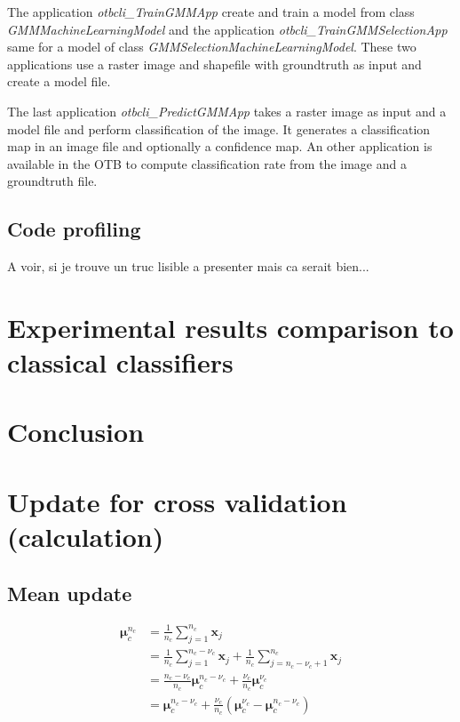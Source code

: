 \documentclass[a4paper,11pt,DIV=16]{scrartcl}
\begin{document}
        The application \emph{otbcli\_TrainGMMApp} create and train a model from class \emph{GMMMachineLearningModel} and the application \emph{otbcli\_TrainGMMSelectionApp} same for a model of class \emph{GMMSelectionMachineLearningModel}. These two applications use a raster image and shapefile with groundtruth as input and create a model file.

        The last application \emph{otbcli\_PredictGMMApp} takes a raster image as input and a model file and perform classification of the image. It generates a classification map in an image file and optionally a confidence map. An other application is available in the OTB to compute classification rate from the image and a groundtruth file.

        \subsection{Code profiling}

        A voir, si je trouve un truc lisible a presenter mais ca serait bien...


    \section{Experimental results comparison to classical classifiers}
    \label{sec:exp-otb}



    \section{Conclusion}



\newpage

\appendix
\section{Update for cross validation (calculation)}
\label{app:cv_maj}

    \subsection{Mean update}
        \begin{align*}
            \boldsymbol{\mu}_c^{n_c} &= \frac{1}{n_c} \sum_{j = 1}^{n_c} \mathbf{x}_j \\
                        &= \frac{1}{n_c} \sum_{j = 1}^{n_c-\nu_c} \mathbf{x}_j + \frac{1}{n_c} \sum_{j = n_c-\nu_c +1}^{n_c} \mathbf{x}_j \\
                        &= \frac{n_c-\nu_c}{n_c} \boldsymbol{\mu}_c^{n_c-\nu_c} + \frac{\nu_c}{n_c} \boldsymbol{\mu}_c^{\nu_c} \\
                        &= \boldsymbol{\mu}_c^{n_c-\nu_c} + \frac{\nu_c}{n_c} (\boldsymbol{\mu}_c^{\nu_c} - \boldsymbol{\mu}_c^{n_c-\nu_c})
        \end{align*}
\end{document}
